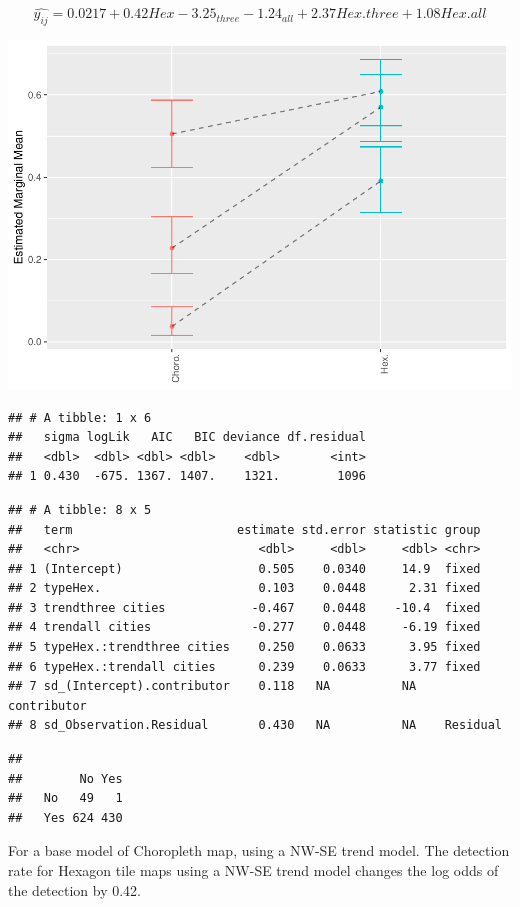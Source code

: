 \documentclass[conference,final,]{IEEEtran}
\makeatletter
\def\maxwidth{\ifdim\Gin@nat@width>\linewidth\linewidth
\else\Gin@nat@width\fi}
\let\Oldincludegraphics\includegraphics
\renewcommand{\includegraphics}[1]{\Oldincludegraphics[width=\maxwidth]{#1}}
\makeatother
\begin{document}
\[\widehat{y_{ij}} = 0.0217 + 0.42Hex -3.25_{three} -1.24_{all} + 2.37{Hex.three} + 1.08{Hex.all} \]

\includegraphics{paper_files/figure-latex/unnamed-chunk-8-1.pdf}

\begin{verbatim}
## # A tibble: 1 x 6
##   sigma logLik   AIC   BIC deviance df.residual
##   <dbl>  <dbl> <dbl> <dbl>    <dbl>       <int>
## 1 0.430  -675. 1367. 1407.    1321.        1096
\end{verbatim}

\begin{verbatim}
## # A tibble: 8 x 5
##   term                       estimate std.error statistic group      
##   <chr>                         <dbl>     <dbl>     <dbl> <chr>      
## 1 (Intercept)                   0.505    0.0340     14.9  fixed      
## 2 typeHex.                      0.103    0.0448      2.31 fixed      
## 3 trendthree cities            -0.467    0.0448    -10.4  fixed      
## 4 trendall cities              -0.277    0.0448     -6.19 fixed      
## 5 typeHex.:trendthree cities    0.250    0.0633      3.95 fixed      
## 6 typeHex.:trendall cities      0.239    0.0633      3.77 fixed      
## 7 sd_(Intercept).contributor    0.118   NA          NA    contributor
## 8 sd_Observation.Residual       0.430   NA          NA    Residual
\end{verbatim}

\begin{verbatim}
##      
##        No Yes
##   No   49   1
##   Yes 624 430
\end{verbatim}

For a base model of Choropleth map, using a NW-SE trend model. The
detection rate for Hexagon tile maps using a NW-SE trend model changes
the log odds of the detection by 0.42.
\end{document}
